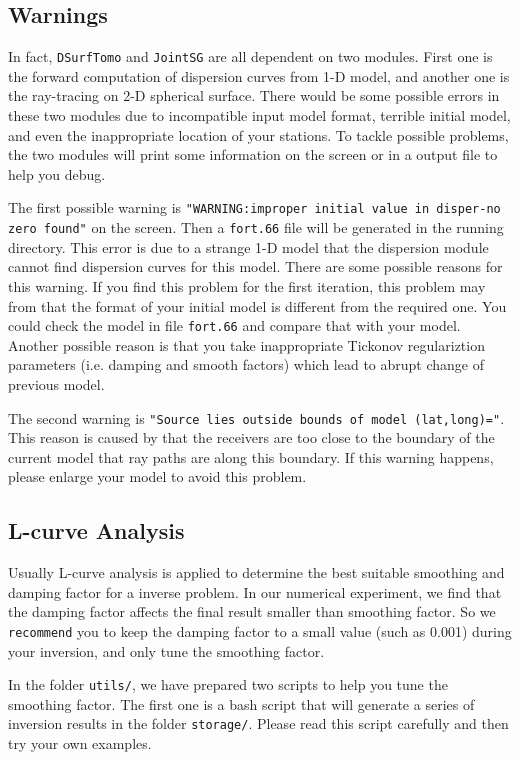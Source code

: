 \documentclass[UTF8]{article}
\begin{document}
\subsection{Warnings}
In fact, \texttt{DSurfTomo} and \texttt{JointSG} are all dependent 
on two modules. First one is the forward computation of dispersion 
curves from 1-D model, and another one is the ray-tracing on 
2-D spherical surface. There would be some possible errors in these 
two modules due to incompatible input model format, terrible initial 
model, and even the inappropriate location of your stations. To tackle possible 
problems, the two modules will print some information on the screen 
or in a output file to help you debug.

The first possible warning is \texttt{"WARNING:improper initial value in 
disper-no zero found"} on the screen. Then a \texttt{fort.66} file will 
be generated in the running directory. This error is due to 
a strange 1-D model that the dispersion module cannot find 
dispersion curves for this model. There are some possible reasons for 
this warning. If you find this problem for the first iteration,
this problem may from that the format of your initial model 
is different from the required one. You could check the model in 
file \texttt{fort.66} and compare that with your model. 
Another possible reason is that you take inappropriate 
Tickonov regulariztion parameters (i.e. damping and smooth factors)
which lead to abrupt change of previous model.

The second warning is \texttt{"Source lies outside bounds 
of model (lat,long)="}.
This reason is caused by that the receivers are too close to 
the boundary of the current model that ray paths are along 
this boundary. If this warning happens, please enlarge your 
model to avoid this problem.

\subsection{L-curve Analysis}
Usually L-curve analysis is applied to determine the best 
suitable smoothing and damping factor for a inverse problem. In our 
numerical experiment, we find that the damping factor affects the 
final result smaller than smoothing factor. So we \texttt{recommend}
you to keep the damping factor to a small value (such as 0.001) during 
your inversion, and only tune the smoothing factor. 


In the folder \texttt{utils/}, we have prepared two scripts to help 
you tune the smoothing factor. The first one is a bash script 
\texttt{}
that will generate a series of inversion results in the folder 
\texttt{storage/}. Please read 
this script carefully and then try your own examples.
\end{document}
